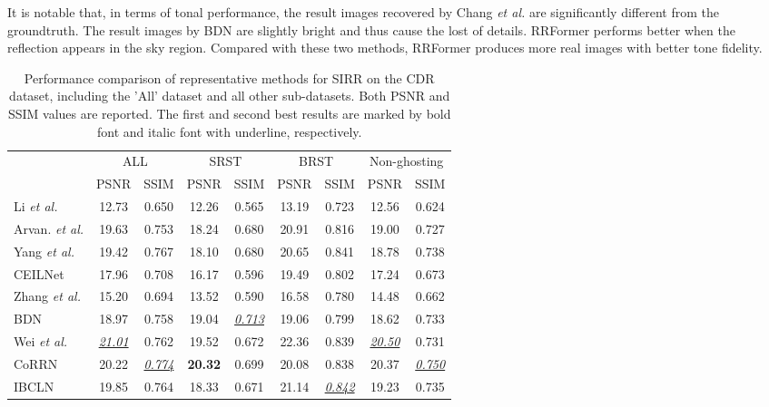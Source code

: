 \documentclass[10pt,journal]{IEEEtran}
\begin{document}
It is notable that, in terms of tonal performance, the result images recovered by Chang \textit{et al.} \cite{changSingleImageReflection2021} are significantly different from the groundtruth. The result images by BDN \cite{yangSeeingDeeplyBidirectionally2018} are slightly bright and thus cause the lost of details. 
RRFormer performs better when the reflection appears in the sky region. Compared with these two methods, RRFormer produces more real images with better tone fidelity.
\begin{table*}[t]
	\caption{Performance comparison of representative methods for SIRR on the CDR dataset, including the 'All' dataset and all other sub-datasets. 
	Both PSNR and SSIM values are reported. The first and second best results are marked by bold font and italic font with underline, respectively. \label{table_cdr}}
	\centering
	\begin{tabular}{lcccccccc}
		\toprule
		&\multicolumn{2}{c}{ALL}&\multicolumn{2}{c}{SRST}&\multicolumn{2}{c}{BRST}&\multicolumn{2}{c}{Non-ghosting}\\
		&PSNR&SSIM&PSNR&SSIM&PSNR&SSIM&PSNR&SSIM\\
		\midrule
		Li \textit{et al.} \cite{liSingleImageLayer2014}&12.73& 0.650& 12.26 & 0.565& 13.19& 0.723& 12.56& 0.624\\
		Arvan. \textit{et al.} \cite{arvanitopoulosSingleImageReflection2017}&19.63& 0.753& 18.24 &0.680 & 20.91& 0.816& 19.00& 0.727\\
		Yang \textit{et al.} \cite{yangFastSingleImage2019}&19.42& 0.767 & 18.10 & 0.680 & 20.65& 0.841& 18.78& 0.738 \\
		\midrule
		CEILNet \cite{fanGenericDeepArchitecture2017}&17.96& 0.708& 16.17 & 0.596& 19.49& 0.802& 17.24& 0.673\\
		Zhang \textit{et al.} \cite{zhangSingleImageReflection2018}&15.20& 0.694& 13.52 & 0.590& 16.58& 0.780& 14.48& 0.662\\
		BDN \cite{yangSeeingDeeplyBidirectionally2018}&18.97& 0.758& 19.04 & \underline{\textit{0.713}}& 19.06& 0.799& 18.62& 0.733\\
		Wei \textit{et al.} \cite{weiSingleImageReflection2019}&\underline{\textit{21.01}} & 0.762& 19.52& 0.672& 22.36 & 0.839& \underline{\textit{20.50}} & 0.731\\
		CoRRN \cite{wanCoRRNCooperativeReflection2019}&20.22& \underline{\textit{0.774}} & \textbf{20.32}& 0.699 & 20.08& 0.838& 20.37& \underline{\textit{0.750}} \\
		IBCLN \cite{liSingleImageReflection2020}&19.85& 0.764& 18.33 & 0.671& 21.14&\underline{\textit{0.842}} & 19.23& 0.735\\

\end{tabular}
\end{table*}
\end{document}
